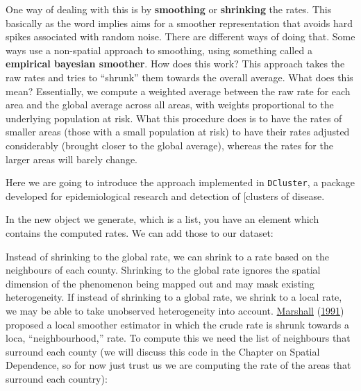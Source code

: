\documentclass[
]{book}
\newenvironment{Shaded}{\begin{snugshade}}{\end{snugshade}}
\newcommand{\DecValTok}[1]{\textcolor[rgb]{0.00,0.00,0.81}{#1}}
\newcommand{\FunctionTok}[1]{\textcolor[rgb]{0.00,0.00,0.00}{#1}}
\newcommand{\NormalTok}[1]{#1}
\newcommand{\OtherTok}[1]{\textcolor[rgb]{0.56,0.35,0.01}{#1}}
\newcommand{\SpecialCharTok}[1]{\textcolor[rgb]{0.00,0.00,0.00}{#1}}
\begin{document}
One way of dealing with this is by \textbf{smoothing} or \textbf{shrinking} the rates. This basically as the word implies aims for a smoother representation that avoids hard spikes associated with random noise. There are different ways of doing that. Some ways use a non-spatial approach to smoothing, using something called a \textbf{empirical bayesian smoother}. How does this work? This approach takes the raw rates and tries to ``shrunk'' them towards the overall average. What does this mean? Essentially, we compute a weighted average between the raw rate for each area and the global average across all areas, with weights proportional to the underlying population at risk. What this procedure does is to have the rates of smaller areas (those with a small population at risk) to have their rates adjusted considerably (brought closer to the global average), whereas the rates for the larger areas will barely change.

Here we are going to introduce the approach implemented in \texttt{DCluster}, a package developed for epidemiological research and detection of {[}clusters of disease.

\begin{Shaded}
\end{Shaded}

In the new object we generate, which is a list, you have an element which contains the computed rates. We can add those to our dataset:

\begin{Shaded}
\end{Shaded}

Instead of shrinking to the global rate, we can shrink to a rate based on the neighbours of each county. Shrinking to the global rate ignores the spatial dimension of the phenomenon being mapped out and may mask existing heterogeneity. If instead of shrinking to a global rate, we shrink to a local rate, we may be able to take unobserved heterogeneity into account. \protect\hyperlink{ref-Marshall_1991}{Marshall} (\protect\hyperlink{ref-Marshall_1991}{1991}) proposed a local smoother estimator in which the crude rate is shrunk towards a loca, ``neighbourhood,'' rate. To compute this we need the list of neighbours that surround each county (we will discuss this code in the Chapter on Spatial Dependence, so for now just trust us we are computing the rate of the areas that surround each country):
\end{document}
